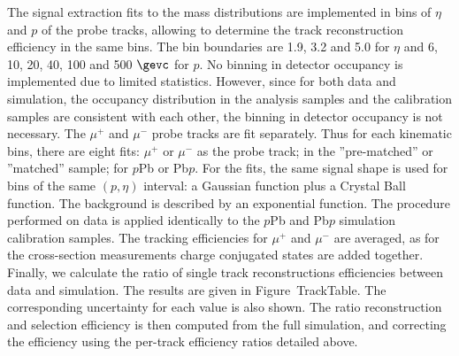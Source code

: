 The signal extraction fits to the mass distributions are implemented in bins of $\eta$ and $p$ of the probe tracks, allowing to determine the track reconstruction efficiency in the same bins. The bin boundaries are 1.9, 3.2 and 5.0 for $\eta$ and 6, 10, 20, 40, 100 and 500 $\gevc$ for $p$. No binning in detector occupancy is implemented due to limited statistics. However, since for both data and simulation, the occupancy distribution in the analysis samples and the calibration samples are consistent with each other,  the binning in detector occupancy is not necessary. 
The $\mu^+$ and $\mu^-$ probe tracks are fit separately. Thus for each kinematic bins, there are eight fits: $\mu^+$ or $\mu^-$ as the probe track; in the ”pre-matched” or ”matched” sample; for $p$Pb or Pb$p$. For the fits, the same signal shape is used for bins of the same $(p, \eta)$ interval: a Gaussian function plus a Crystal Ball function. The background is described by an exponential function. 
The procedure performed on data is applied identically to the $p$Pb and Pb$p$ simulation calibration samples. The tracking efficiencies for $\mu^+$ and $\mu^-$ are averaged, as for the cross-section measurements charge conjugated states are added together.
Finally, we calculate the ratio of single track reconstructions efficiencies between data and simulation. The results are given in Figure~{TrackTable}. The corresponding uncertainty for each value is also shown. The ratio reconstruction and selection efficiency is then computed from the full simulation, and correcting the efficiency using the per-track efficiency ratios detailed above.